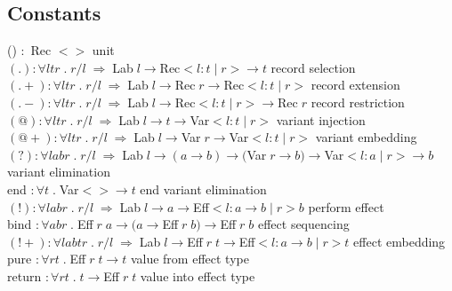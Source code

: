 \documentclass[12pt]{article}
\begin{document}
\subsection{Constants}
() $:$ Rec $<>$ \hspace{15pt} unit \\
$(.) : \forall l t r \; . \; r/l  \; \Rightarrow \; $Lab$ \; l \rightarrow $Rec$ < l : t \; | \; r > \rightarrow t $ \hspace{15pt} record selection \\
$(.{+}) : \forall l t r \; . \; r/l  \; \Rightarrow \; $Lab$ \; l \rightarrow $Rec$ \; r \rightarrow $Rec$ < l : t \; | \; r > $ \hspace{15pt} record extension \\
$(.-) : \forall l t r \; . \; r/l  \; \Rightarrow \; $Lab$ \; l \rightarrow $Rec$ <l : t \; | \; r > \rightarrow $Rec$ \; r $ \hspace{15pt} record restriction \\
$(@) : \forall l t r \; . \; r/l  \; \Rightarrow \; $Lab$ \; l \rightarrow t \rightarrow $Var$ <l : t \; | \; r >$ \hspace{15pt} variant injection \\
$(@{+}) : \forall l t r \; . \; r/l  \; \Rightarrow \; $Lab$ \; l \rightarrow $Var$ \; r \rightarrow $Var$ <l : t \; | \; r >$ \hspace{15pt} variant embedding \\
$(?) : \forall l a b r \; . \; r/l  \; \Rightarrow \; $Lab$ \; l \rightarrow ( a \rightarrow b ) \rightarrow ($Var$ \; r \rightarrow b) \rightarrow $Var$ <l : a \; | \; r> \rightarrow b$ \hspace{15pt} variant elimination \\
end $: \forall t \; . \; $Var$ <> \rightarrow t$ \hspace{15pt} end variant elimination \\
$(!) : \forall l a b r \; . \; r/l  \; \Rightarrow \; $Lab$ \; l \rightarrow a \rightarrow $Eff$ <l : a \rightarrow b \; | \; r > b$ \hspace{15pt} perform effect \\
bind $: \forall a b r \; . \; $Eff$ \; r \; a \rightarrow (a \rightarrow $Eff$ \; r \; b) \rightarrow $Eff$ \; r \; b $ \hspace{15pt} effect sequencing \\
$(!{+}) : \forall l a b t r \; . \; r/l  \; \Rightarrow \; $Lab$ \; l \rightarrow $Eff$ \; r \; t \rightarrow $Eff$ <l : a \rightarrow b \; | \; r > t$ \hspace{15pt} effect embedding \\
pure $: \forall rt \; . \; $Eff$ \; r \; t  \rightarrow t$ \hspace{15pt} value from effect type \\
return $: \forall rt \; . \; t \rightarrow $Eff$ \; r \; t$ \hspace{15pt} value into effect type \\
\end{document}
